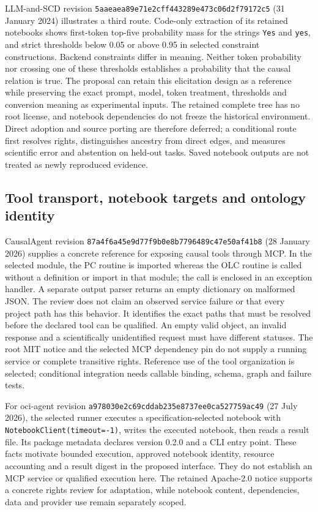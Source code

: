 LLM-and-SCD revision
\texttt{5aaeaea89e71e2cff443}\allowbreak\texttt{289e473c06d2f79172c5}
(31 January 2024) illustrates a third route. Code-only extraction of its
retained notebooks shows first-token top-five probability mass for the strings
\texttt{Yes} and \texttt{yes}, and strict thresholds below 0.05 or above 0.95
in selected constraint constructions. Backend constraints differ in meaning.
Neither token probability nor crossing one of these thresholds establishes a
probability that the causal relation is true. The proposal can retain this
elicitation design as a reference while preserving the exact prompt, model,
token treatment, thresholds and conversion meaning as experimental inputs.
The retained complete tree has no root license, and notebook dependencies do
not freeze the historical environment. Direct adoption and source porting are
therefore deferred; a conditional route first resolves rights, distinguishes
ancestry from direct edges, and measures scientific error and abstention on
held-out tasks. Saved notebook outputs are not treated as newly reproduced
evidence.\citep{exec14_iid_scd,exec25_agents_choice}

\subsection{Tool transport, notebook targets and ontology identity}
CausalAgent revision
\texttt{87a4f6a45e9d77f9b0e8}\allowbreak\texttt{b7796489c47e50af41b8}
(28 January 2026) supplies a concrete reference for exposing causal tools through
MCP. In the selected module, the PC routine is imported whereas the OLC routine
is called without a definition or import in that module; the call is enclosed
in an exception handler. A separate output parser returns an empty dictionary
on malformed JSON. The review does not claim an observed service failure or
that every project path has this behavior. It identifies the exact paths that
must be resolved before the declared tool can be qualified. An empty valid
object, an invalid response and a scientifically unidentified request must have
different statuses. The root MIT notice and the selected MCP dependency pin do
not supply a running service or complete transitive rights. Reference use of
the tool organization is selected; conditional integration needs callable
binding, schema, graph and failure tests.\citep{exec13_data_causalagent_code,exec25_agents_choice}

For oci-agent revision
\texttt{a978030e2c69cddab235}\allowbreak\texttt{e8737ee0ca527759ac49}
(27 July 2026), the selected runner executes a specification-selected notebook
with \texttt{NotebookClient(timeout=-1)}, writes the executed notebook, then
reads a result file. Its package metadata declares version 0.2.0 and a CLI
entry point. These facts motivate bounded execution, approved notebook
identity, resource accounting and a result digest in the proposed interface.
They do not establish an MCP service or qualified execution here. The retained
Apache-2.0 notice supports a concrete rights review for adaptation, while
notebook content, dependencies, data and provider use remain separately
scoped.\citep{exec13_data_oci_code,exec25_agents_choice}

